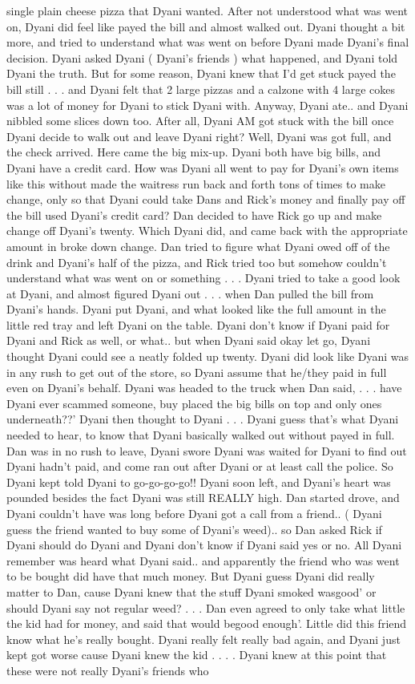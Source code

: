 \documentclass[12pt]{book}
\begin{document}
single plain cheese pizza that Dyani wanted. After not understood what was went on, Dyani did feel like payed the bill and almost walked out. Dyani thought a bit more, and tried to understand what was went on before Dyani made Dyani's final decision. Dyani asked Dyani ( Dyani's friends ) what happened, and Dyani told Dyani the truth. But for some reason, Dyani knew that I'd get stuck payed the bill still  . . .  and Dyani felt that 2 large pizzas and a calzone with 4 large cokes was a lot of money for Dyani to stick Dyani with. Anyway, Dyani ate.. and Dyani nibbled some slices down too. After all, Dyani AM got stuck with the bill once Dyani decide to walk out and leave Dyani right? Well, Dyani was got full, and the check arrived. Here came the big mix-up. Dyani both have big bills, and Dyani have a credit card. How was Dyani all went to pay for Dyani's own items like this without made the waitress run back and forth tons of times to make change, only so that Dyani could take Dans and Rick's money and finally pay off the bill used Dyani's credit card? Dan decided to have Rick go up and make change off Dyani's twenty. Which Dyani did, and came back with the appropriate amount in broke down change. Dan tried to figure what Dyani owed off of the drink and Dyani's half of the pizza, and Rick tried too but somehow couldn't understand what was went on or something . . .  Dyani tried to take a good look at Dyani, and almost figured Dyani out . . .  when Dan pulled the bill from Dyani's hands. Dyani put Dyani, and what looked like the full amount in the little red tray and left Dyani on the table. Dyani don't know if Dyani paid for Dyani and Rick as well, or what.. but when Dyani said okay let go, Dyani thought Dyani could see a neatly folded up twenty. Dyani did look like Dyani was in any rush to get out of the store, so Dyani assume that he/they paid in full even on Dyani's behalf. Dyani was headed to the truck when Dan said, . . .  have Dyani ever scammed someone, buy placed the big bills on top and only ones underneath??' Dyani then thought to Dyani  . . .  Dyani guess that's what Dyani needed to hear, to know that Dyani basically walked out without payed in full. Dan was in no rush to leave, Dyani swore Dyani was waited for Dyani to find out Dyani hadn't paid, and come ran out after Dyani or at least call the police. So Dyani kept told Dyani to go-go-go-go!! Dyani soon left, and Dyani's heart was pounded besides the fact Dyani was still REALLY high. Dan started drove, and Dyani couldn't have was long before Dyani got a call from a friend.. ( Dyani guess the friend wanted to buy some of Dyani's weed).. so Dan asked Rick if Dyani should do Dyani and Dyani don't know if Dyani said yes or no. All Dyani remember was heard what Dyani said.. and apparently the friend who was went to be bought did have that much money. But Dyani guess Dyani did really matter to Dan, cause Dyani knew that the stuff Dyani smoked wasgood' or should Dyani say not regular weed? . . .  Dan even agreed to only take what little the kid had for money, and said that would begood enough'. Little did this friend know what he's really bought. Dyani really felt really bad again, and Dyani just kept got worse cause Dyani knew the kid . . .  . Dyani knew at this point that these were not really Dyani's friends who 
\end{document}
